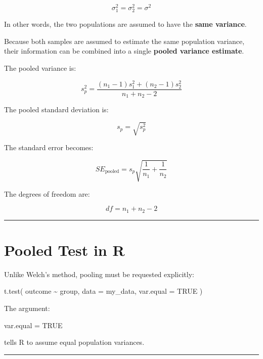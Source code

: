 \documentclass[
  letterpaper,
  DIV=11,
  numbers=noendperiod]{scrreprt}
\newenvironment{Shaded}{\begin{snugshade}}{\end{snugshade}}
\newcommand{\AttributeTok}[1]{\textcolor[rgb]{0.40,0.45,0.13}{#1}}
\newcommand{\ConstantTok}[1]{\textcolor[rgb]{0.56,0.35,0.01}{#1}}
\newcommand{\FunctionTok}[1]{\textcolor[rgb]{0.28,0.35,0.67}{#1}}
\newcommand{\NormalTok}[1]{\textcolor[rgb]{0.00,0.23,0.31}{#1}}
\newcommand{\OtherTok}[1]{\textcolor[rgb]{0.00,0.23,0.31}{#1}}
\newcommand{\SpecialCharTok}[1]{\textcolor[rgb]{0.37,0.37,0.37}{#1}}
\begin{document}
\[
\boxed{
\sigma_1^2=\sigma_2^2=\sigma^2
}
\]

In other words, the two populations are assumed to have the \textbf{same
variance}.

Because both samples are assumed to estimate the same population
variance, their information can be combined into a single \textbf{pooled
variance estimate}.

The pooled variance is:

\[
\boxed{
s_p^2
=
\frac{
(n_1-1)s_1^2
+
(n_2-1)s_2^2
}{
n_1+n_2-2
}
}
\]

The pooled standard deviation is:

\[
s_p=\sqrt{s_p^2}
\]

The standard error becomes:

\[
\boxed{
SE_{\text{pooled}}
=
s_p
\sqrt{
\frac{1}{n_1}
+
\frac{1}{n_2}
}
}
\]

The degrees of freedom are:

\[
df=n_1+n_2-2
\]

\begin{center}\rule{0.5\linewidth}{0.5pt}\end{center}

\section{Pooled Test in R}\label{pooled-test-in-r}

Unlike Welch's method, pooling must be requested explicitly:

\begin{Shaded}
\begin{Highlighting}[]
\FunctionTok{t.test}\NormalTok{(}
\NormalTok{    outcome }\SpecialCharTok{\textasciitilde{}}\NormalTok{ group,}
    \AttributeTok{data =}\NormalTok{ my\_data,}
    \AttributeTok{var.equal =} \ConstantTok{TRUE}
\NormalTok{)}
\end{Highlighting}
\end{Shaded}

The argument:

\begin{Shaded}
\begin{Highlighting}[]
\NormalTok{var.equal }\OtherTok{=} \ConstantTok{TRUE}
\end{Highlighting}
\end{Shaded}

tells R to assume equal population variances.

\begin{center}\rule{0.5\linewidth}{0.5pt}\end{center}
\end{document}
